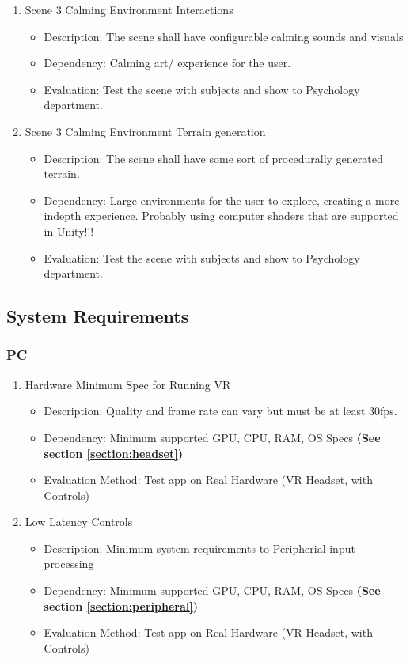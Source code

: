 \documentclass[a4paper,10pt]{article}
\begin{document}
\begin{enumerate}
		\item Scene 3 Calming Environment Interactions 
		\begin{itemize}
		\item Description: The scene shall have configurable calming sounds and visuals
		\item Dependency: Calming art/ experience for the user.
		\item Evaluation: Test the scene with subjects and show to Psychology department. 
		\end{itemize}
		
		\item Scene 3 Calming Environment Terrain generation
		\begin{itemize}
		\item Description: The scene shall have some sort of procedurally generated terrain. 
		\item Dependency: Large environments for the user to explore, creating a more indepth experience. Probably using computer shaders that are supported in Unity!!!
		\item Evaluation: Test the scene with subjects and show to Psychology department. 
		\end{itemize}
		
	\end{enumerate}

	\subsection{System Requirements}
	\subsubsection{PC}
		\begin{enumerate}
			\item Hardware Minimum Spec for Running VR
			\begin{itemize}
				\item Description: Quality and frame rate can vary but must be at least 30fps.
				\item Dependency: Minimum supported GPU, CPU, RAM, OS Specs \textbf{(See section \ref{section:headset})}
				\item Evaluation Method: Test app on Real Hardware (VR Headset, with Controls)
			\end{itemize}
			\item Low Latency Controls
			\begin{itemize}
				\item Description: Minimum system requirements to Peripherial input processing
				\item Dependency: Minimum supported GPU, CPU, RAM, OS Specs \textbf{(See section \ref{section:peripheral})}
				\item Evaluation Method: Test app on Real Hardware (VR Headset, with Controls)
			\end{itemize}
		\end{enumerate}
\end{document}
